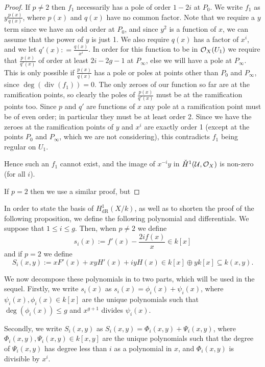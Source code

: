 \documentclass[draft, 11pt]{article} %
\theoremstyle{plain}
\theoremstyle{remark}
\newcommand{\cO}{{\cal O}}
\newcommand{\cU}{{\mathcal U}}
\newcommand{\derhamhone}{H_{\text {dR}}^1(X/k)}
\DeclareMathOperator{\di}{div}
\begin{document}
\begin{proof}
If $p \neq 2$ then $f_1$ necessarily has a pole of order $1-2i$ at $P_0$.
We write $f_1$ as $y \frac{p(x)}{q(x)}$, where $p(x)$ and $q(x)$ have no common factor.
Note that we require a $y$ term since we have an odd order at $P_0$, and since $y^2$ is a function of $x$, we can assume that the power of $y$ is just 1.
We also require $q(x)$ has a factor of $x^i$, and we let $q'(x) : = \frac{q(x)}{x^i}$.
In order for this function to be in $\cO_X(U_1)$ we require that $\frac{p(x)}{q'(x)}$ of order at least $2i-2g-1$ at $P_\infty$, else we will have a pole at $P_\infty$.
This is only possible if $\frac{p(x)}{q(x)}$ has a pole or poles at points other than $P_0$ and $P_\infty$, since $\deg(\di(f_1)) = 0$.
The only zeroes of our function so far are at the ramification points, so clearly the poles of $\frac{p(x)}{q'(x)}$ must be at the ramification points too.
Since $p$ and $q'$ are functions of $x$ any pole at a ramification point must be of even order; in particular they must be at least order 2.
Since we have the zeroes at the ramification points of $y$ and $x^i$ are exactly order 1 (except at the points $P_0$ and $P_\infty$, which we are not considering), this contradicts $f_1$ being regular on $U_1$.

Hence such an $f_1$ cannot exist, and the image of $x^{-i}y$ in $\check{H}^1(\cU,\cO_X)$ is non-zero (for all $i$).


If $p=2$ then we use a similar proof, but 
\end{proof}


In order to state the basis of $\derhamhone$, as well as to shorten the proof of the following proposition, we define the following polynomial and differentials. 
We suppose that $1 \leq i \leq g$.
Then, when $p\neq 2$ we define
\[
s_i(x) := f'(x) - \frac{2if(x)}{x} \in k[x]
\]
and if $p = 2$ we define
\[
S_i(x,y) := xF'(x) + xyH'(x) + iyH(x)\in k[x]\oplus yk[x] \subseteq k(x,y).
\]

We now decompose these polynomials in to two parts, which will be used in the sequel.
Firstly, we write $s_i(x)$ as $s_i(x) = \phi_i(x) + \psi_i(x)$, where $\psi_i(x), \phi_i(x) \in k[x]$ are the unique polynomials such that $\deg(\phi_i (x)) \leq g$ and $x^{g+1}$ divides $\psi_i(x)$.



Secondly, we write $S_i(x,y)$ as $S_i(x,y) = \Phi_i(x,y) + \Psi_i(x,y)$, where $\Phi_i(x,y), \Psi_i(x,y) \in k[x,y]$ are the unique polynomials such that the degree of $\Psi_i(x,y)$ has degree less than $i$ as a polynomial in $x$, and $\Phi_i(x,y)$ is divisible by $x^i$.
\end{document}
